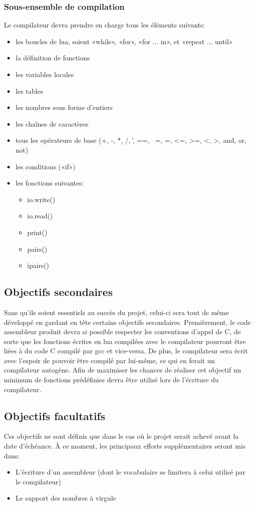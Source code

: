 \documentclass{article}
\begin{document}
\subsubsection{Sous-ensemble de compilation}
Le compilateur devra prendre en charge tous les éléments suivants:
\begin{itemize}
\item les boucles de lua, soient «while», «for», «for ... in», et «repeat ... until»
\item la définition de fonctions
\item les variables locales
\item les tables
\item les nombres sous forme d'entiers
\item les chaînes de caractères
\item tous les opérateurs de base (+, -, *, /, \^, ==, ~=, =, <=, >=, <, >, and, or, not)
\item les conditions («if»)
\item les fonctions suivantes:
  \begin {itemize}
  \item io.write()
  \item io.read()
  \item print()
  \item pairs()
  \item ipairs()
  \end {itemize}
\end {itemize}

\subsection{Objectifs secondaires}
Sans qu'ils soient essentiels au succès du projet, celui-ci sera tout de même développé en gardant en tête certains objectifs secondaires. Premièrement, le code assembleur produit devra si possible respecter les conventions d'appel de C, de sorte que les fonctions écrites en lua compilées avec le compilateur pourront être liées à du code C compilé par gcc et vice-versa. De plus, le compilateur sera écrit avec l'espoir de pouvoir être compilé par lui-même, ce qui en ferait un compilateur autogène. Afin de maximiser les chances de réaliser cet objectif un minimum de fonctions prédéfinies devra être utilisé lors de l'écriture du compilateur.

\subsection{Objectifs facultatifs}
Ces objectifs ne sont définis que dans le cas où le projet serait achevé avant la date d'échéance. À ce moment, les principaux efforts supplémentaires seront mis dans:
\begin{itemize}
\item L'écriture d'un assembleur (dont le vocabulaire se limitera à celui utilisé par le compilateur)
\item Le support des nombres à virgule
\end{itemize}
\end{document}
